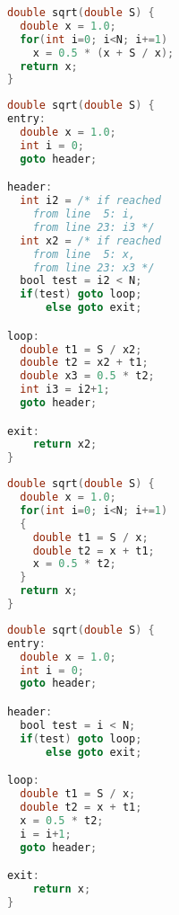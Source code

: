 \begin{minipage}{0.48\textwidth}
\begin{lstlisting}[language=C,captionpos=t,title=
   {{\bf(a)} {} C source function:\leftskip=0pt}]
double sqrt(double S) {
  double x = 1.0;
  for(int i=0; i<N; i+=1)
    x = 0.5 * (x + S / x);
  return x;
}
\end{lstlisting}
\begin{lstlisting}[language=C,captionpos=t,title=
   {{\bf(d)} {} The SSA property is introduced:\leftskip=0pt}]
double sqrt(double S) {
entry:
  double x = 1.0;
  int i = 0;
  goto header;

header:
  int i2 = /* if reached
    from line  5: i,
    from line 23: i3 */
  int x2 = /* if reached
    from line  5: x,
    from line 23: x3 */
  bool test = i2 < N;
  if(test) goto loop;
      else goto exit;

loop:
  double t1 = S / x2;
  double t2 = x2 + t1;
  double x3 = 0.5 * t2;
  int i3 = i2+1;
  goto header;

exit:
    return x2;
}
\end{lstlisting}
\end{minipage}
\hfill
\begin{minipage}{0.48\textwidth}
\begin{lstlisting}[language=C,basicstyle=\linespread{1.06451612903}\ttfamily,
                   captionpos=t,title=
   {{\bf(b)} {} Complex expressions are broken down:\leftskip=0pt}]
double sqrt(double S) {
  double x = 1.0;
  for(int i=0; i<N; i+=1)
  {
    double t1 = S / x;
    double t2 = x + t1;
    x = 0.5 * t2;
  }
  return x;
}
\end{lstlisting}
\begin{lstlisting}[language=C,basicstyle=\linespread{1.06451612903}\ttfamily,
                   captionpos=t,title=
   {{\bf(c)} {} Structured control flow is expanded:\leftskip=0pt}]
double sqrt(double S) {
entry:
  double x = 1.0;
  int i = 0;
  goto header;

header:
  bool test = i < N;
  if(test) goto loop;
      else goto exit;

loop:
  double t1 = S / x;
  double t2 = x + t1;
  x = 0.5 * t2;
  i = i+1;
  goto header;

exit:
    return x;
}
\end{lstlisting}
\end{minipage}
